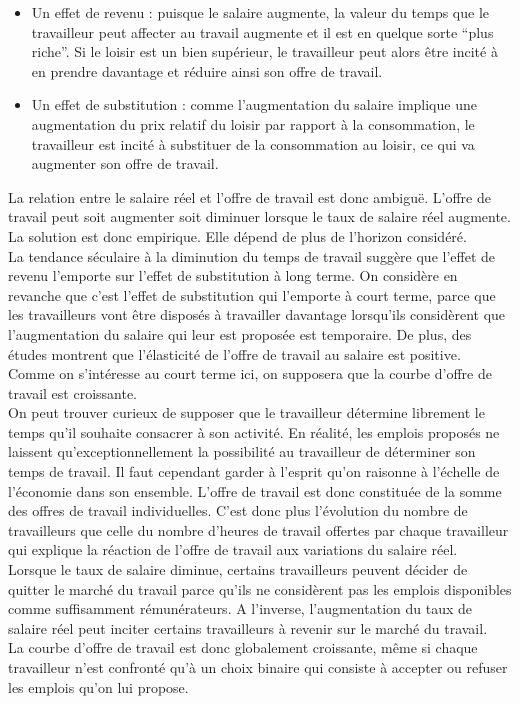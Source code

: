\documentclass[10pt]{book}
\begin{document}
\begin{itemize}
  \item Un effet de revenu : puisque le salaire augmente, la valeur du temps que le travailleur peut affecter au travail augmente et il est en quelque sorte ``plus riche''. Si le loisir est un bien supérieur, le travailleur peut alors être incité à en prendre davantage et réduire ainsi son offre de travail.
  \item Un effet de substitution : comme l'augmentation du salaire implique une augmentation du prix relatif du loisir par rapport à la consommation, le travailleur est incité à substituer de la consommation au loisir, ce qui va augmenter son offre de travail. 
\end{itemize}
La relation entre le salaire réel et l'offre de travail est donc ambiguë. L'offre de travail peut soit augmenter soit diminuer lorsque le taux de salaire réel augmente. La solution est donc empirique. Elle dépend de plus de l'horizon considéré. \\
La tendance séculaire à la diminution du temps de travail suggère que l'effet de revenu l'emporte sur l'effet de substitution à long terme. On considère en revanche que c'est l'effet de substitution qui l'emporte à court terme, parce que les travailleurs vont être disposés à travailler davantage lorsqu'ils considèrent que l'augmentation du salaire qui leur est proposée est temporaire. De plus, des études montrent que l'élasticité de l'offre de travail au salaire est positive. \\
Comme on s'intéresse au court terme ici, on supposera que la courbe d'offre de travail est croissante. \\
On peut trouver curieux de supposer que le travailleur détermine librement le temps qu'il souhaite consacrer à son activité. En réalité, les emplois proposés ne laissent qu'exceptionnellement la possibilité au travailleur de déterminer son temps de travail. Il faut cependant garder à l'esprit qu'on raisonne à l'échelle de l'économie dans son ensemble. L'offre de travail est donc constituée de la somme des offres de travail individuelles. C'est donc plus l'évolution du nombre de travailleurs que celle du nombre d'heures de travail offertes par chaque travailleur qui explique la réaction de l'offre de travail aux variations du salaire réel. \\
Lorsque le taux de salaire diminue, certains travailleurs peuvent décider de quitter le marché du travail parce qu'ils ne considèrent pas les emplois disponibles comme suffisamment rémunérateurs. A l'inverse, l'augmentation du taux de salaire réel peut inciter certains travailleurs à revenir sur le marché du travail. \\
La courbe d'offre de travail est donc globalement croissante, même si chaque travailleur n'est confronté qu'à un choix binaire qui consiste à accepter ou refuser les emplois qu'on lui propose.
\end{document}
